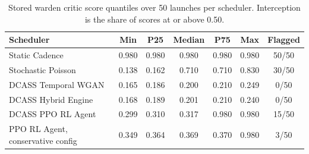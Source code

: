 \begin{table}[htbp]
\centering
\caption{Stored warden critic score quantiles over 50 launches per scheduler. Interception is the share of scores at or above 0.50.}
\label{tab:warden_score_quantiles}
\begin{tabular}{lcccccc}
\toprule
Scheduler & Min & P25 & Median & P75 & Max & Flagged \\
\midrule
Static Cadence & 0.980 & 0.980 & 0.980 & 0.980 & 0.980 & 50/50 \\
Stochastic Poisson & 0.138 & 0.162 & 0.710 & 0.710 & 0.830 & 30/50 \\
DCASS Temporal WGAN & 0.165 & 0.186 & 0.200 & 0.210 & 0.249 & 0/50 \\
DCASS Hybrid Engine & 0.168 & 0.189 & 0.201 & 0.210 & 0.240 & 0/50 \\
DCASS PPO RL Agent & 0.299 & 0.310 & 0.317 & 0.980 & 0.980 & 15/50 \\
PPO RL Agent, conservative config & 0.349 & 0.364 & 0.369 & 0.370 & 0.980 & 3/50 \\
\bottomrule
\end{tabular}
\end{table}
